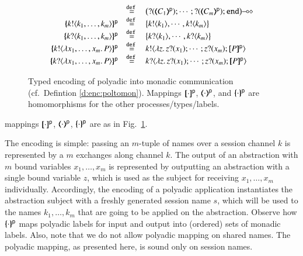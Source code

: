 \begin{definition}
\begin{figure}[t]
\[\begin{array}{rcl}
		&\defeq&
		\lhot{\big(\btinp{\tmap{C_1}{\mathsf{p}}} \cdots; \btinp{\tmap{C_m}{\mathsf{p}}}\tinact\big)}
		\\
		\mapa{\bactout{k}{k_1, \ldots, k_m}}^\mathsf{p} &\defeq&   \big\{\bactout{k}{k_1}, \cdots, \bactout{k}{k_m}\big\} \\
		\mapa{\bactinp{k}{k_1, \ldots, k_m}}^\mathsf{p} &\defeq&   \big\{\bactinp{k}{k_1}, \cdots, \bactinp{k}{k_m} \big\}\\
		\mapa{\bactout{k}{\abs{x_1, \ldots, x_m}{P}} }^\mathsf{p} &\defeq&  \bactout{k}{\abs{z}\binp{z}{x_1} \cdots ; \binp{z}{x_m} \map{P}^{\mathsf{p}}} \\
		\mapa{\bactinp{k}{\abs{x_1, \ldots, x_m}{P}} }^\mathsf{p} &\defeq&  \bactinp{k}{\abs{z}\binp{z}{x_1} \cdots ; \binp{z}{x_m} \map{P}^{\mathsf{p}}} 
	\end{array}
\]
\caption{\label{f:enc:poltomon}
Typed encoding of polyadic into monadic communication (cf.~Defintion \ref{d:enc:poltomon}). 
Mappings 
$[\!\![\cdot]\!\!]^\mathsf{p}$,
$(\!\!\langle\cdot\rangle\!\!)^\mathsf{p}$, 
and 
$\{\!\!\{\cdot\}\!\!\}^\mathsf{p}$
are homomorphisms for the other processes/types/labels. 
}
\end{figure}
mappings $[\!\![\cdot]\!\!]^{\mathsf{p}}$, $(\!\!\langle\cdot\rangle\!\!)^{\mathsf{p}}$, $\{\!\!\{\cdot\}\!\!\}^{\mathsf{p}}$
are 
as in Fig.~\ref{f:enc:poltomon}.
\end{definition}
%
The encoding is simple:
passing an $m$-tuple of names over a session channel $k$ is represented by 
a $m$ exchanges along channel $k$.
The output of an abstraction with $m$ bound variables $x_1, \ldots, x_m$ is represented by
outputting an abstraction with a single bound variable $z$,
which is used as the subject for receiving $x_1, \ldots, x_m$ individually. 
Accordingly, 
the encoding of a polyadic application  instantiates
the abstraction subject with a freshly generated session name $s$, which will be used  
to the names 
$k_1, \ldots, k_m$
that are going to be applied on the abstraction.
Observe how $\{\!\!\{\cdot\}\!\!\}^{\mathsf{p}}$ maps polyadic labels for input and output into (ordered) sets of
monadic labels. Also, note that we do not allow polyadic mapping on shared names.
The polyadic mapping, as presented here, is sound only on session names.

